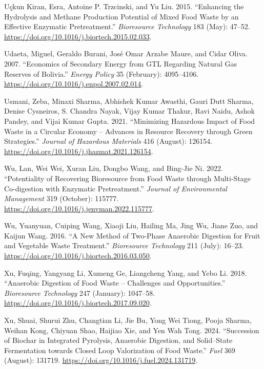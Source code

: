 \documentclass[11pt]{report}
\begin{document}
\begin{hangparas}{1.5em}{1}
\hypertarget{citeproc_bib_item_26}{Uçkun Kiran, Esra, Antoine P. Trzcinski, and Yu Liu. 2015. “Enhancing the Hydrolysis and Methane Production Potential of Mixed Food Waste by an Effective Enzymatic Pretreatment.” \textit{Bioresource Technology} 183 (May): 47–52. \url{https://doi.org/10.1016/j.biortech.2015.02.033}.}

\hypertarget{citeproc_bib_item_27}{Udaeta, Miguel, Geraldo Burani, José Omar Arzabe Maure, and Cidar Oliva. 2007. “Economics of Secondary Energy from GTL Regarding Natural Gas Reserves of Bolivia.” \textit{Energy Policy} 35 (February): 4095–4106. \url{https://doi.org/10.1016/j.enpol.2007.02.014}.}

\hypertarget{citeproc_bib_item_28}{Usmani, Zeba, Minaxi Sharma, Abhishek Kumar Awasthi, Gauri Dutt Sharma, Denise Cysneiros, S. Chandra Nayak, Vijay Kumar Thakur, Ravi Naidu, Ashok Pandey, and Vijai Kumar Gupta. 2021. “Minimizing Hazardous Impact of Food Waste in a Circular Economy – Advances in Resource Recovery through Green Strategies.” \textit{Journal of Hazardous Materials} 416 (August): 126154. \url{https://doi.org/10.1016/j.jhazmat.2021.126154}.}

\hypertarget{citeproc_bib_item_29}{Wu, Lan, Wei Wei, Xuran Liu, Dongbo Wang, and Bing-Jie Ni. 2022. “Potentiality of Recovering Bioresource from Food Waste through Multi-Stage Co-digestion with Enzymatic Pretreatment.” \textit{Journal of Environmental Management} 319 (October): 115777. \url{https://doi.org/10.1016/j.jenvman.2022.115777}.}

\hypertarget{citeproc_bib_item_30}{Wu, Yuanyuan, Cuiping Wang, Xiaoji Liu, Hailing Ma, Jing Wu, Jiane Zuo, and Kaijun Wang. 2016. “A New Method of Two-Phase Anaerobic Digestion for Fruit and Vegetable Waste Treatment.” \textit{Bioresource Technology} 211 (July): 16–23. \url{https://doi.org/10.1016/j.biortech.2016.03.050}.}

\hypertarget{citeproc_bib_item_31}{Xu, Fuqing, Yangyang Li, Xumeng Ge, Liangcheng Yang, and Yebo Li. 2018. “Anaerobic Digestion of Food Waste – Challenges and Opportunities.” \textit{Bioresource Technology} 247 (January): 1047–58. \url{https://doi.org/10.1016/j.biortech.2017.09.020}.}

\hypertarget{citeproc_bib_item_32}{Xu, Shuai, Shurui Zhu, Changtian Li, Jie Bu, Yong Wei Tiong, Pooja Sharma, Weihan Kong, Chiyuan Shao, Haijiao Xie, and Yen Wah Tong. 2024. “Succession of Biochar in Integrated Pyrolysis, Anaerobic Digestion, and Solid–State Fermentation towards Closed Loop Valorization of Food Waste.” \textit{Fuel} 369 (August): 131719. \url{https://doi.org/10.1016/j.fuel.2024.131719}.}


\end{hangparas}
\end{document}
